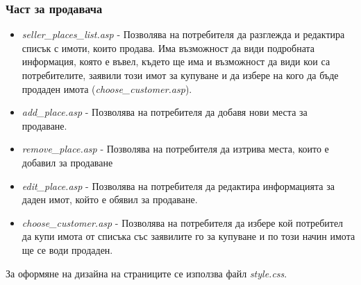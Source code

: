 \documentclass[a4paper,12pt, leqno]{article}
\begin{document}
\subsubsection{Част за продавача}
\begin{itemize}
 \item \textit{seller\_places\_list.asp} - Позволява на потребителя да разглежда и редактира списък с имоти, които 
продава. Има възможност да види подробната информация, която е въвел, където ще има и възможност да 
види кои са потребителите, заявили този имот за купуване и да избере на кого да бъде продаден имота
 (\textit{choose\_customer.asp}).
 \item \textit{add\_place.asp} - Позволява на потребителя да добавя нови места за продаване.
 \item \textit{remove\_place.asp} - Позволява на потребителя да изтрива места, които е добавил за продаване
 \item \textit{edit\_place.asp} - Позволява на потребителя да редактира информацията за даден имот, 
който е обявил за продаване.
 \item \textit{choose\_customer.asp} - Позволява на потребителя да избере кой потребител да купи имота от списъка със 
заявилите го за купуване и по този начин имота ще се води продаден.
\end{itemize}

За оформяне на дизайна на страниците се използва файл \textit{style.css}.
\end{document}
